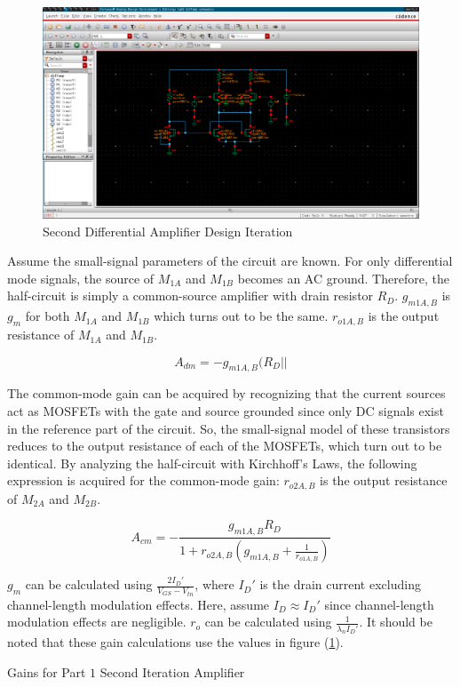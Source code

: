 \FloatBarrier

\begin{figure}[h!]
	\centering
	\includegraphics[scale=0.75]{../images/diff_amp_2.PNG}
	\caption{Second Differential Amplifier Design Iteration}
	\label{fig:diff_amp_2}
\end{figure}

\FloatBarrier

Assume the small-signal parameters of the circuit are known.
For only differential mode signals, the source of $M_{1A}$ and $M_{1B}$ becomes an AC ground.
Therefore, the half-circuit is simply a common-source amplifier with drain resistor $R_{D}$.
$g_{m1A,B}$ is $g_{m}$ for both $M_{1A}$ and $M_{1B}$ which turns out to be the same.
$r_{o1A,B}$ is the output resistance of $M_{1A}$ and $M_{1B}$.

\begin{equation}
	\label{eq:dm_gain}
	A_{dm} = - g_{m1A,B} ( R_{D} || 
\end{equation}

The common-mode gain can be acquired by recognizing that the current sources act as MOSFETs with the gate and source grounded since only DC signals exist in the reference part of the circuit.
So, the small-signal model of these transistors reduces to the output resistance of each of the MOSFETs, which turn out to be identical.
By analyzing the half-circuit with Kirchhoff's Laws, the following expression is acquired for the common-mode gain:
$r_{o2A,B}$ is the output resistance of $M_{2A}$ and $M_{2B}$.

\begin{equation}
	\label{eq:cm_gain}
	A_{cm} = - \frac{ g_{m1A,B} R_{D} }{ 1 + r_{o2A,B} ( g_{m1A,B} + \frac{ 1 }{ r_{o1A,B} } ) }
\end{equation}

$g_{m}$ can be calculated using $\frac{ 2 I_{D}' }{ V_{GS} - V_{tn} }$, where $I_{D}'$ is the drain current excluding channel-length modulation effects.
Here, assume $I_{D} \approx I_{D}'$ since channel-length modulation effects are negligible.
$r_{o}$ can be calculated using $\frac{1}{\lambda _{n} I_{D}' }$.
It should be noted that these gain calculations use the values in figure (\ref{fig:diff_amp_2}).

\FloatBarrier

\begin{table}[h!]
	\centering
	\caption{Gains for Part $1$ Second Iteration Amplifier}
	\label{tab:sim1_gain}
\end{table}

\FloatBarrier
